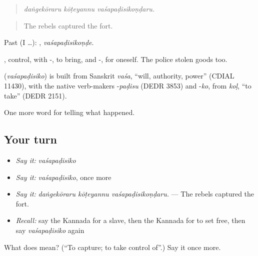 \begin{quote}
\emph{daṅgekōraru kōṭeyannu vaśapaḍisikoṇḍaru.}
\end{quote}

\begin{quote}
The rebels captured the fort.
\end{quote}

Past (I …): , \emph{vaśapaḍisikoṇḍe}.

, control, with -, to bring, and -, for oneself. The police  stolen goods too.

\begin{cousinweb}
\textbf{} (\emph{vaśapaḍisiko}) is built from Sanskrit \emph{vaśa}, \textquotedblleft{}will, authority, power\textquotedblright{} (CDIAL 11430), with the native verb-makers -\emph{paḍisu} (DEDR 3853) and -\emph{ko}, from \emph{koḷ}, \textquotedblleft{}to take\textquotedblright{} (DEDR 2151).
\end{cousinweb}

\begin{grammarlens}[title={What you've built}]
One more word for telling what happened.
\end{grammarlens}

\subsection*{Your turn}
\begin{itemize}
\raggedright
  \item \emph{Say it:} \emph{vaśapaḍisiko}
  \item \emph{Say it:} \emph{vaśapaḍisiko}, once more
  \item \emph{Say it:} \emph{daṅgekōraru kōṭeyannu vaśapaḍisikoṇḍaru.} — The rebels captured the fort.
  \item \emph{Recall:} say the Kannada for a slave, then the Kannada for to set free, then say \emph{vaśapaḍisiko} again
\end{itemize}

\begin{tcolorbox}[breakable,colback=teal!4,colframe=teal!35!black,title={Before you move on}]
What does  mean? (\textquotedblleft{}To capture; to take control of\textquotedblright{}.) Say it once more.
\end{tcolorbox}
